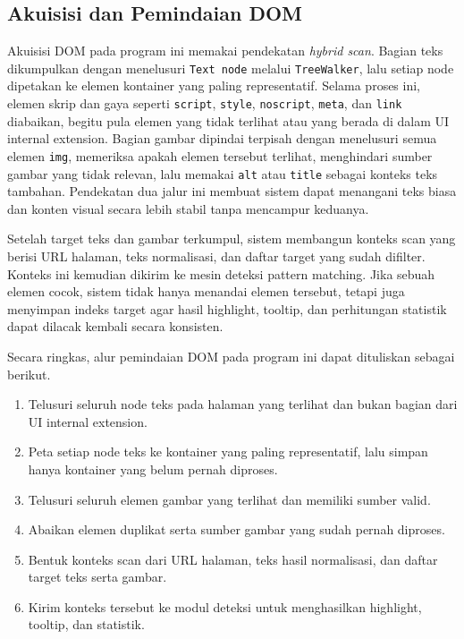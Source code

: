 \subsection{Akuisisi dan Pemindaian DOM}

Akuisisi DOM pada program ini memakai pendekatan \textit{hybrid scan}. Bagian teks dikumpulkan dengan menelusuri \texttt{Text node} melalui \texttt{TreeWalker}, lalu setiap node dipetakan ke elemen kontainer yang paling representatif. Selama proses ini, elemen skrip dan gaya seperti \texttt{script}, \texttt{style}, \texttt{noscript}, \texttt{meta}, dan \texttt{link} diabaikan, begitu pula elemen yang tidak terlihat atau yang berada di dalam UI internal extension. Bagian gambar dipindai terpisah dengan menelusuri semua elemen \texttt{img}, memeriksa apakah elemen tersebut terlihat, menghindari sumber gambar yang tidak relevan, lalu memakai \texttt{alt} atau \texttt{title} sebagai konteks teks tambahan. Pendekatan dua jalur ini membuat sistem dapat menangani teks biasa dan konten visual secara lebih stabil tanpa mencampur keduanya.

Setelah target teks dan gambar terkumpul, sistem membangun konteks scan yang berisi URL halaman, teks normalisasi, dan daftar target yang sudah difilter. Konteks ini kemudian dikirim ke mesin deteksi pattern matching. Jika sebuah elemen cocok, sistem tidak hanya menandai elemen tersebut, tetapi juga menyimpan indeks target agar hasil highlight, tooltip, dan perhitungan statistik dapat dilacak kembali secara konsisten.

Secara ringkas, alur pemindaian DOM pada program ini dapat dituliskan sebagai berikut.

\begin{enumerate}
    \item Telusuri seluruh node teks pada halaman yang terlihat dan bukan bagian dari UI internal extension.
    \item Peta setiap node teks ke kontainer yang paling representatif, lalu simpan hanya kontainer yang belum pernah diproses.
    \item Telusuri seluruh elemen gambar yang terlihat dan memiliki sumber valid.
    \item Abaikan elemen duplikat serta sumber gambar yang sudah pernah diproses.
    \item Bentuk konteks scan dari URL halaman, teks hasil normalisasi, dan daftar target teks serta gambar.
    \item Kirim konteks tersebut ke modul deteksi untuk menghasilkan highlight, tooltip, dan statistik.
\end{enumerate}
